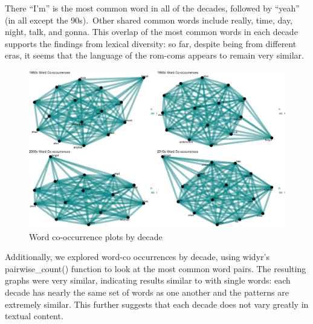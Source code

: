 \documentclass[
  authoryear,
  preprint]{elsarticle}
\begin{document}
There ``I'm'' is the most common word in all of the decades, followed by
``yeah'' (in all except the 90s).~Other shared common words include
really, time, day, night, talk, and gonna. This overlap of the most
common words in each decade supports the findings from lexical
diversity: so far, despite being from different eras, it seems that the
language of the rom-coms appears to remain very similar.

\begin{figure}[H]

{\centering \includegraphics{images/co4-imageonline.co-merged-imageonline.co-merged.png}

}

\caption{Word co-occurrence plots by decade}

\end{figure}%

Additionally, we explored word-co occurrences by decade, using widyr's
pairwise\_count() function to look at the most common word pairs. The
resulting graphs were very similar, indicating results similar to with
single words: each decade has nearly the same set of words as one
another and the patterns are extremely similar. This further suggests
that each decade does not vary greatly in textual content.
\end{document}
